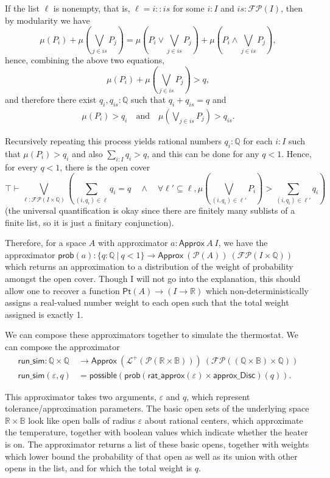\documentclass{article}           %
\newcommand{\R}{\mathbb{R}}
\newcommand{\rat}{\mathbb{Q}}
\newcommand{\suchthat}{\ |\ }
\newcommand{\bool}{\mathbb{B}}
\newcommand{\Prob}{\mathcal{P}}
\newcommand{\PLower}{\mathcal{L}^+}
\begin{document}
If the list $\ell$ is nonempty, that is, $\ell = i :: is$ for some $i : I$ and $is : \mathcal{FP}(I)$, then by modularity we have
\[
\mu(P_i) +  \mu \left( \bigvee_{j \in is} P_j \right) = 
 \mu \left( P_i \vee \bigvee_{j \in is} P_j \right) + \mu \left( P_i \wedge \bigvee_{j \in is} P_j \right),
\]
hence, combining the above two equations,
\[
\mu(P_i) +  \mu \left( \bigvee_{j \in is} P_j \right) > q,
\]
and therefore there exist $q_i, q_{is} : \rat$ such that $q_i + q_{is} = q$ and
\begin{align*}
\mu(P_i) > q_i \quad \text{and} \quad  \mu \left( \bigvee_{j \in is} P_j \right) > q_{is}.
\end{align*}

Recursively repeating this process yields rational numbers $q_i : \rat$ for each $i : I$ such that $\mu(P_i) > q_i$ and also $\sum_{i : I} q_i > q$, and this can be done for any $q < 1$. Hence, for every $q < 1$, there is the open cover
\[
\top \vdash \bigvee_{\ell : \mathcal{FP}(I \times \rat)} \left(
\sum_{(i, q_i) \in \ell} q_i = q \quad \wedge \quad \forall \ell' \subseteq \ell, \mu\left( \bigvee_{(i, q_i) \in \ell'} P_i \right) > \sum_{(i, q_i) \in \ell'} q_i \right)
\]
(the universal quantification is okay since there are finitely many sublists of a finite list, so it is just a finitary conjunction).

Therefore, for a space $A$ with approximator $a : \mathsf{Approx}\ A\ I$, we have the approximator $\mathsf{prob}(a) : \{ q : \rat \suchthat q < 1 \} \to \mathsf{Approx}\ (\Prob(A))\ (\mathcal{FP}(I \times \rat))$ which returns an approximation to a distribution of the weight of probability amongst the open cover. Though I will not go into the explanation, this should allow one to recover a function $\mathsf{Pt}(A) \to (I \to \R)$ which non-deterministically assigns a real-valued number weight to each open such that the total weight assigned is exactly 1.

We can compose these approximators together to simulate the thermostat. We can compose the approximator
\begin{align*}
\mathsf{run\_sim} : \rat \times \rat &\to \mathsf{Approx}\ (\PLower(\Prob(\R \times \bool)))\ (\mathcal{FP}((\rat \times \bool) \times \rat))
\\
\mathsf{run\_sim}(\varepsilon, q) &= 
\mathsf{possible}(\mathsf{prob}(\mathsf{rat\_approx}(\varepsilon) \times \mathsf{approx\_Disc})(q)).
\end{align*}

This approximator takes two arguments, $\varepsilon$ and $q$, which represent tolerance/approximation parameters. The basic open sets of the underlying space $\R \times \bool$ look like open balls of radius $\varepsilon$ about rational centers, which approximate the temperature, together with boolean values which indicate whether the heater is on. The approximator returns a list of these basic opens, together with weights which lower bound the probability of that open as well as its union with other opens in the list, and for which the total weight is $q$.
\end{document}
